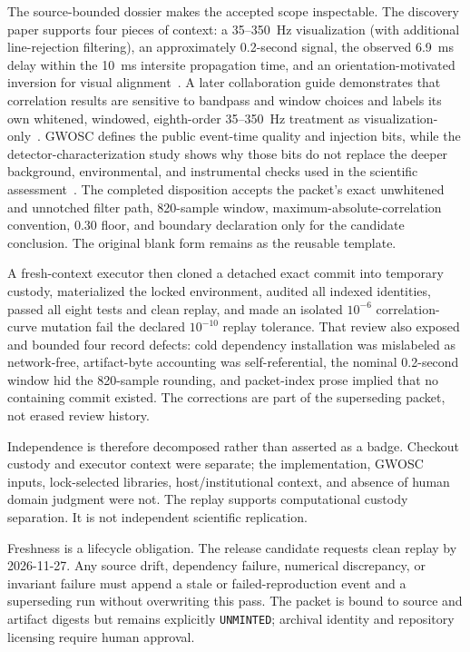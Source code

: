 \documentclass[11pt]{article}
\begin{document}
The source-bounded dossier makes the accepted scope inspectable. The discovery paper supports four pieces of context: a 35--350~Hz visualization (with additional line-rejection filtering), an approximately 0.2-second signal, the observed 6.9~ms delay within the 10~ms intersite propagation time, and an orientation-motivated inversion for visual alignment~\citep{abbott-gw150914-discovery-2016}. A later collaboration guide demonstrates that correlation results are sensitive to bandpass and window choices and labels its own whitened, windowed, eighth-order 35--350~Hz treatment as visualization-only~\citep{abbott-lvc-data-guide-2020}. GWOSC defines the public event-time quality and injection bits, while the detector-characterization study shows why those bits do not replace the deeper background, environmental, and instrumental checks used in the scientific assessment~\citep{gwosc-technical-details-2026,gwosc-o1-data-2018,abbott-gw150914-noise-2016}. The completed disposition accepts the packet's exact unwhitened and unnotched filter path, 820-sample window, maximum-absolute-correlation convention, 0.30 floor, and boundary declaration only for the candidate conclusion. The original blank form remains as the reusable template.

A fresh-context executor then cloned a detached exact commit into temporary custody, materialized the locked environment, audited all indexed identities, passed all eight tests and clean replay, and made an isolated $10^{-6}$ correlation-curve mutation fail the declared $10^{-10}$ replay tolerance. That review also exposed and bounded four record defects: cold dependency installation was mislabeled as network-free, artifact-byte accounting was self-referential, the nominal 0.2-second window hid the 820-sample rounding, and packet-index prose implied that no containing commit existed. The corrections are part of the superseding packet, not erased review history.

Independence is therefore decomposed rather than asserted as a badge. Checkout custody and executor context were separate; the implementation, GWOSC inputs, lock-selected libraries, host/institutional context, and absence of human domain judgment were not. The replay supports computational custody separation. It is not independent scientific replication.

Freshness is a lifecycle obligation. The release candidate requests clean replay by 2026-11-27. Any source drift, dependency failure, numerical discrepancy, or invariant failure must append a stale or failed-reproduction event and a superseding run without overwriting this pass. The packet is bound to source and artifact digests but remains explicitly \texttt{UNMINTED}; archival identity and repository licensing require human approval.
\end{document}
